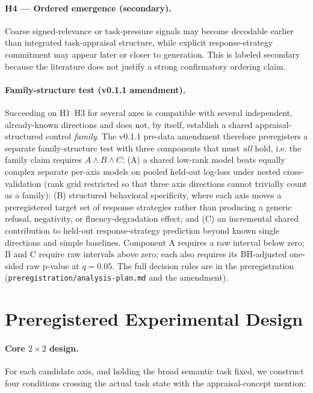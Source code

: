 \documentclass[11pt]{article}
\begin{document}
\paragraph{H4 --- Ordered emergence (secondary).}
Coarse signed-relevance or task-pressure signals may become decodable earlier than
integrated task-appraisal structure, while explicit response-strategy commitment
may appear later or closer to generation. This is labeled secondary because the
literature does not justify a strong confirmatory ordering claim.

\paragraph{Family-structure test (v0.1.1 amendment).}
Succeeding on H1--H3 for several axes is compatible with several independent,
already-known directions and does not, by itself, establish a shared
appraisal-structured control \emph{family}. The v0.1.1 pre-data amendment therefore
preregisters a separate family-structure test with three components that must
\emph{all} hold, i.e. the family claim requires $A \wedge B \wedge C$: (A) a shared
low-rank model beats equally complex separate per-axis models on pooled held-out
log-loss under nested cross-validation (rank grid restricted so that three axis
directions cannot trivially count as a family); (B) structured behavioral
specificity, where each axis moves a preregistered target set of response strategies
rather than producing a generic refusal, negativity, or fluency-degradation effect;
and (C) an incremental shared contribution to held-out response-strategy prediction
beyond known single directions and simple baselines. Component A requires a raw
interval below zero; B and C require raw intervals above zero; each also requires
its BH-adjusted one-sided raw p-value at $q=0.05$. The full decision rules are in
the preregistration (\texttt{preregistration/analysis-plan.md} and the amendment).

\section{Preregistered Experimental Design}
\label{sec:design}

\paragraph{Core $2\times2$ design.}
For each candidate axis, and holding the broad semantic task fixed, we construct
four conditions crossing the actual task state with the appraisal-concept mention:
\end{document}
